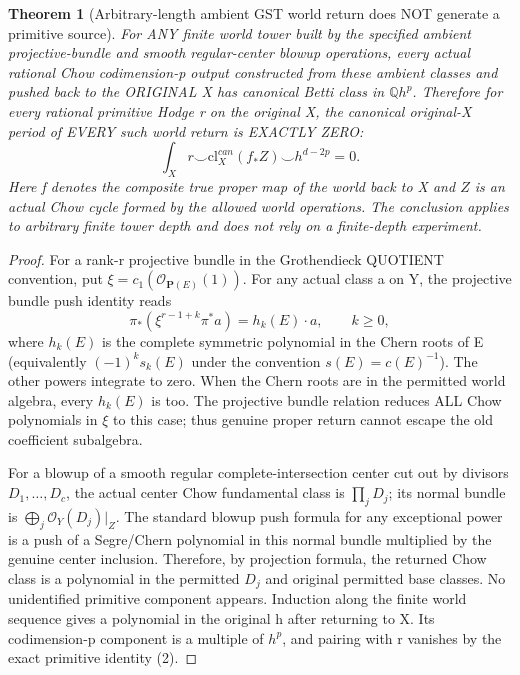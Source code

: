 \documentclass[11pt]{article}
\newcommand{\Q}{\mathbb Q}
\newcommand{\cl}{\mathrm{cl}}
\newcommand{\OO}{\mathcal O}
\newtheorem{theorem}{Theorem}
\begin{document}
\begin{theorem}[Arbitrary-length ambient GST world return does NOT generate a primitive source]
For ANY finite world tower built by the specified
ambient projective-bundle and smooth regular-center
blowup operations, every actual rational Chow
codimension-p output constructed from these ambient
classes and pushed back to the ORIGINAL X has
canonical Betti class in \(\Q h^p\).
Therefore for every rational primitive Hodge r on
the original X, the canonical original-X period of
EVERY such world return is EXACTLY ZERO:
\[
 \boxed{
 \int_X r\smile \cl_X^{can}(f_*Z)\smile
            h^{d-2p}=0.}                            \tag{7a}
\]
Here f denotes the composite true proper map of the
world back to X and \(Z\) is an actual Chow cycle
formed by the allowed world operations.
The conclusion applies to arbitrary finite tower
depth and does not rely on a finite-depth experiment.
\end{theorem}
\begin{proof}
For a rank-r projective bundle in the
Grothendieck QUOTIENT convention, put
\(\xi=c_1(\OO_{\mathbf P(E)}(1))\).
For any actual class a on Y, the projective
bundle push identity reads
\[
 \pi_*(\xi^{r-1+k}\pi^*a)=
       h_k(E)\cdot a,\qquad k\ge0,
\]
where \(h_k(E)\) is the complete symmetric
polynomial in the Chern roots of E
(equivalently \((-1)^k s_k(E)\) under the
convention \(s(E)=c(E)^{-1}\)).
The other powers integrate to zero.
When the Chern roots are in the permitted
world algebra, every \(h_k(E)\) is too.
The projective bundle relation reduces ALL Chow
polynomials in \(\xi\) to this case; thus genuine
proper return cannot escape the old coefficient
subalgebra.

For a blowup of a smooth regular complete-intersection
center cut out by divisors \(D_1,\dots,D_c\), the actual
center Chow fundamental class is \(\prod_jD_j\);
its normal bundle is
\(\bigoplus_j\OO_Y(D_j)|_Z\).
The standard blowup push formula for any exceptional
power is a push of a Segre/Chern polynomial in this
normal bundle multiplied by the genuine center
inclusion. Therefore, by projection formula,
the returned Chow class is a polynomial in the
permitted \(D_j\) and original permitted base classes.
No unidentified primitive component appears.
Induction along the finite world sequence gives a
polynomial in the original h after returning to X.
Its codimension-p component is a multiple of \(h^p\),
and pairing with r vanishes by the exact primitive
identity (2).
\end{proof}
\end{document}
